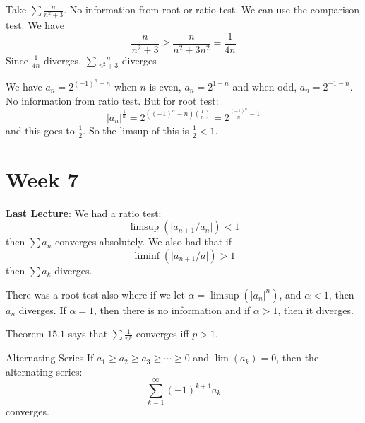 \documentclass{report}
\begin{document}
\begin{examples}
    \begin{example}
        Take $\sum \frac{n}{n^{2} + 3}$. No information from root or ratio test. We can use the comparison test. We have
            \begin{equation*}
                \dfrac{n}{n^{2} + 3} \geq \dfrac{n}{n^{2} + 3n^{2}} = \dfrac{1}{4n}
            \end{equation*}
        Since $\frac{1}{4n}$ diverges, $\sum \frac{n}{n^{2} + 3}$ diverges
    \end{example}
    \begin{example}
        We have $a_{n} = 2^{(-1)^{n} - n}$ when $n$ is even, $a_{n}  = 2^{1 - n}$ and when odd, $a_{n} = 2^{- 1 - n}$. No information from ratio test. But for root test:
            \begin{equation*}
                \lvert a_{n} \rvert^{\frac{1}{n}} = 2^{((-1)^{n} - n)(\frac{1}{n})}= 2^{\frac{(-1)^{n}}{n} - 1}
            \end{equation*}
        and this goes to $\frac{1}{2}$. So the limsup of this is $\frac{1}{2} <  1$.
    \end{example}
\end{examples}

\chapter{Week 7}

\textbf{Last Lecture}: We had a ratio test: 
    \begin{equation*}
        \limsup(\lvert a_{n + 1}/a_{n} \rvert) < 1
    \end{equation*}
then $\sum a_{n}$ converges absolutely. We also had that if 
    \begin{equation*}
        \liminf(\lvert a_{n + 1}/a \rvert) > 1
    \end{equation*}
then $\sum a_{k}$ diverges. 

There was a root test also where if we let $\alpha = \limsup(\lvert a_{n} \rvert^{n})$, and $\alpha<  1$, then $a_{n}$ diverges. If $\alpha = 1$, then there is no information and if $\alpha > 1$, then it diverges.

Theorem $15.1$ says that $\sum \frac{1}{n^{p}}$ converges iff $p > 1$.

\begin{theorem}{Alternating Series}
    If $a_{1} \geq a_{2} \geq a_{3} \geq \cdots  \geq 0$ and $\lim(a_{k}) = 0$, then the alternating series:
        \begin{equation*}
            \sum_{k = 1}^{\infty}(-1)^{k + 1}a_{k}
        \end{equation*}
    converges.
\end{theorem}
\end{document}
